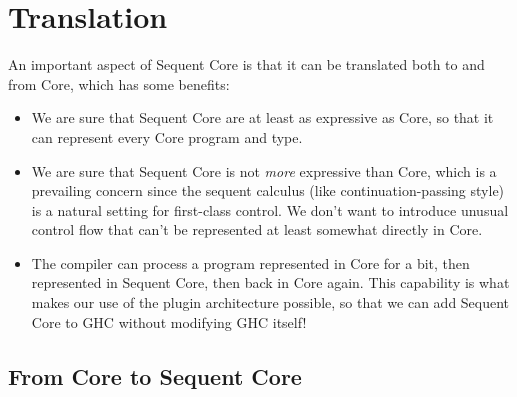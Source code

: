 \documentclass{article}
\begin{document}

\section{Translation}
\label{sec:translation}

An important aspect of Sequent Core is that it can be translated both to and
from Core, which has some benefits:
\begin{itemize}
\item We are sure that Sequent Core are at least as expressive as Core, so that
  it can represent every Core program and type.
\item We are sure that Sequent Core is not \emph{more} expressive than Core,
  which is a prevailing concern since the sequent calculus (like
  continuation-passing style) is a natural setting for first-class control.  We
  don't want to introduce unusual control flow that can't be represented at
  least somewhat directly in Core.
\item The compiler can process a program represented in Core for a bit, then
  represented in Sequent Core, then back in Core again.  This capability is what
  makes our use of the plugin architecture possible, so that we can add Sequent
  Core to GHC without modifying GHC itself!
\end{itemize}

\subsection{From Core to Sequent Core}
\end{document}
